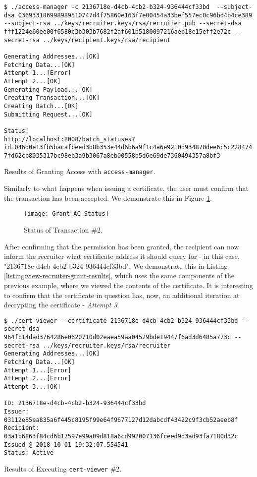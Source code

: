 \begin{listing}[ht]
	\begin{verbatim}
$ ./access-manager -c 2136718e-d4cb-4cb2-b324-936444cf33bd  --subject-dsa 036933186998989510747d4f75860e163f7e00454a33bef557ec0c96bd4b4ce389 --subject-rsa ../keys/recruiter.keys/rsa/recruiter.pub --secret-dsa fff1224e60ee00f6580c3b303b7682f2af601b5180097216aeb18e15eff2e72c --secret-rsa ../keys/recipient.keys/rsa/recipient

Generating Addresses...[OK]
Fetching Data...[OK]
Attempt 1...[Error]
Attempt 2...[OK]
Generating Payload...[OK]
Creating Transaction...[OK]
Creating Batch...[OK]
Submitting Request...[OK]

Status:
http://localhost:8008/batch_statuses?id=046d0e13fb5bacafbeed3b8b353e44d6b6a9f1c4a6e9210d934870dee6c5c228474
7fd62cb8035317bc98eb3a9b3067a8eb00558b5d6e69de7360494357a8bf3
\end{verbatim}
	\caption{Results of Granting Access with \texttt{access-manager}.}
	\label{listing:grant-ac-results}
\end{listing}

Similarly to what happens when issuing a certificate, the user must confirm that the transaction has been accepted. We demonstrate this in Figure \ref{fig:grant-ac-status}.

\begin{figure}[htb]
	\centering
	\texttt{[image: Grant-AC-Status]}
	\caption{Status of Transaction \#2.}
	\label{fig:grant-ac-status}
\end{figure}

After confirming that the permission has been granted, the recipient can now inform the recruiter what certificate address it should query for - in this case, "2136718e-d4cb-4cb2-b324-936444cf33bd". We demonstrate this in Listing \ref{listing:view-recruiter-grant-results}, which uses the same components of the previous example, where we viewed the contents of the certificate. It is interesting to confirm that the certificate in question has, now, an additional iteration at decrypting the certificate - \emph{Attempt 3}.

\begin{listing}[ht]
	\begin{verbatim}
$ ./cert-viewer --certificate 2136718e-d4cb-4cb2-b324-936444cf33bd --secret-dsa 964fb14dad3764286e0620710d02eaea59aa04529bde19447f6ad3d6485a773c --secret-rsa ../keys/recruiter.keys/rsa/recruiter
Generating Addresses...[OK]
Fetching Data...[OK]
Attempt 1...[Error]
Attempt 2...[Error]
Attempt 3...[OK]

ID: 2136718e-d4cb-4cb2-b324-936444cf33bd
Issuer: 03112e85ea835a6f445c8195f99e64f9677127d12dabcdf43422c9f3cb52aeeb8f
Recipient: 03a1b6863f84cd6b17597e99a09d818a6cd992007136fceed9d3ad93fa7180d32c
Issued @ 2018-10-01 19:32:07.554541
Status: Active

\end{verbatim}
	\caption{Results of Executing \texttt{cert-viewer} \#2.}
	\label{listing:view-recruiter-grant-results}
\end{listing}

